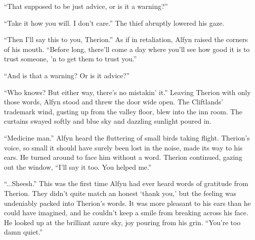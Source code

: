 ``That supposed to be just advice, or is it a warning?''

``Take it how you will. I don't care.'' The thief abruptly lowered his gaze.

``Then I'll say this to you, Therion.'' As if in retaliation, Alfyn raised the corners of his mouth. ``Before long, there'll come a day where you'll see how good it is to trust someone, 'n to get them to trust you.''

``And is that a warning? Or is it advice?''

``Who knows? But either way, there's no mistakin' it.'' Leaving Therion with only those words, Alfyn stood and threw the door wide open. The Cliftlands' trademark wind, gusting up from the valley floor, blew into the inn room. The curtains swayed softly and blue sky and dazzling sunlight poured in. 

``Medicine man.'' Alfyn heard the fluttering of small birds taking flight. Therion's voice, so small it should have surely been lost in the noise, made its way to his ears. He turned around to face him without a word. Therion continued, gazing out the window, ``I'll say it too. You helped me.''

``...Sheesh.'' This was the first time Alfyn had ever heard words of gratitude from Therion. They didn't quite match an honest `thank you,' but the feeling was undeniably packed into Therion's words. It was more pleasant to his ears than he could have imagined, and he couldn't keep a smile from breaking across his face. He looked up at the brilliant azure sky, joy pouring from his grin. ``You're too damn quiet.''
\printendnotes